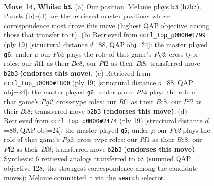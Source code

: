 \documentclass[11pt]{article}
\begin{document}
\clearpage

\begin{figure}[p]\centering
\begin{subfigure}{0.46\textwidth}\centering
\resizebox{\linewidth}{!}{%
\newchessgame
\chessboard[
  setfen={rnbqr3/p3bpkp/2p1p1p1/1p1n4/3P4/3Q1BP1/PP1NPP1P/RNB2RK1 w - - 2 14},
  showmover=false,
  pgfstyle=straightmove, color=movearrow, markmove={b2-b3}
]}
\caption{}
\end{subfigure}\hfill
\begin{subfigure}{0.46\textwidth}\centering
\resizebox{\linewidth}{!}{%
\newchessgame
\chessboard[
  setfen={r1b1kb1r/ppqpnppp/4p3/3n4/2NP4/2PB3N/PP3PPP/R1BQK2R b KQkq - 2 10},
  showmover=false,
  pgfstyle=straightmove, color=movearrow, markmove={g7-g6}
]}
\caption{}
\end{subfigure}
\\[4pt]
\begin{subfigure}{0.46\textwidth}\centering
\resizebox{\linewidth}{!}{%
\newchessgame
\chessboard[
  setfen={r1b1kb1r/ppqpnppp/4p3/3n4/2NP4/2PB3N/PP3PPP/R1BQK2R b KQkq - 2 10},
  showmover=false,
  pgfstyle=straightmove, color=movearrow, markmove={g7-g6}
]}
\caption{}
\end{subfigure}\hfill
\begin{subfigure}{0.46\textwidth}\centering
\resizebox{\linewidth}{!}{%
\newchessgame
\chessboard[
  setfen={r1b1kb1r/ppqpnppp/4p3/3n4/2NP4/2PB3N/PP3PPP/R1BQK2R b KQkq - 2 10},
  showmover=false,
  pgfstyle=straightmove, color=movearrow, markmove={g7-g6}
]}
\caption{}
\end{subfigure}
\caption{\textbf{Move 14, White: \texttt{b3}.} (a) Our position; Melanie plays \texttt{b3} (\texttt{b2b3}). Panels (b)--(d) are the retrieved master positions whose correspondence most drove this move (highest QAP objective among those that transfer to it). (b) Retrieved from \texttt{ccrl\_top\_p0000\#1799} (ply 19) [structural distance $d$=88, QAP obj=24]: the master played \texttt{g6}; under $\mu$ our \emph{Pb2} plays the role of that game's \emph{Pg2}; cross-type roles: our \emph{R}f1 as their \emph{B}c8, our \emph{P}f2 as their \emph{B}f8; transferred move \texttt{b2b3} \textbf{(endorses this move)}. (c) Retrieved from \texttt{ccrl\_top\_p0000\#1800} (ply 19) [structural distance $d$=88, QAP obj=24]: the master played \texttt{g6}; under $\mu$ our \emph{Pb2} plays the role of that game's \emph{Pg2}; cross-type roles: our \emph{R}f1 as their \emph{B}c8, our \emph{P}f2 as their \emph{B}f8; transferred move \texttt{b2b3} \textbf{(endorses this move)}. (d) Retrieved from \texttt{ccrl\_top\_p0000\#2474} (ply 19) [structural distance $d$=88, QAP obj=24]: the master played \texttt{g6}; under $\mu$ our \emph{Pb2} plays the role of that game's \emph{Pg2}; cross-type roles: our \emph{R}f1 as their \emph{B}c8, our \emph{P}f2 as their \emph{B}f8; transferred move \texttt{b2b3} \textbf{(endorses this move)}. Synthesis: 6 retrieved analogs transferred to \texttt{b3} (summed QAP objective 128, the strongest correspondence among the candidate moves); Melanie committed it via the \texttt{search} selector.}
\label{fig:thought-m26}
\end{figure}
\end{document}
